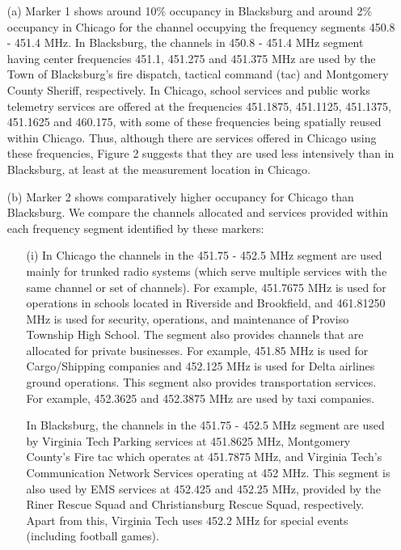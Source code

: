 \documentclass[12pt,sts]{report}
\begin{document}
		\begin{enumerate}
		
			\item[(a)] Marker 1 shows around 10\% occupancy in Blacksburg and around 2\% occupancy in Chicago for the channel occupying the frequency segments 450.8 - 451.4 MHz. In Blacksburg, the channels in 450.8 - 451.4 MHz segment having center frequencies 451.1, 451.275 and 451.375 MHz are used by the Town of Blacksburg's fire dispatch, tactical command (tac) and Montgomery County Sheriff, respectively. In Chicago, school services and public works telemetry services are offered at the frequencies 451.1875, 451.1125, 451.1375, 451.1625 and 460.175, with some of these frequencies being spatially reused within Chicago. 
			Thus, although there are services offered in Chicago using these frequencies, Figure 2 suggests that they are used less intensively than in Blacksburg, at least at the measurement location in Chicago.
			
			\item[(b)] Marker 2 shows comparatively higher occupancy for Chicago than Blacksburg. We compare the channels allocated and services provided within each frequency segment identified by these markers:
			
			\begin{enumerate}
				
				\item[(i)] In Chicago the channels in the 451.75 - 452.5 MHz segment are used mainly for trunked radio systems (which serve multiple services with the same channel or set of channels). For example, 451.7675 MHz is used for operations in schools located in Riverside and Brookfield, and 461.81250 MHz is used for security, operations, and maintenance of Proviso Township High School. The segment also provides channels that are allocated for private businesses. For example, 451.85 MHz is used for Cargo/Shipping companies and 452.125 MHz is used for Delta airlines ground operations. This segment also provides transportation services. For example, 452.3625 and 452.3875 MHz are used by taxi companies.
				
				In Blacksburg, the channels in the 451.75 - 452.5 MHz segment are used by Virginia Tech Parking services at 451.8625 MHz, Montgomery County's Fire tac which operates at 451.7875 MHz, and Virginia Tech's Communication Network Services operating at 452 MHz. This segment is also used by EMS services at 452.425 and 452.25 MHz, provided by the Riner Rescue Squad and Christiansburg Rescue Squad, respectively. Apart from this, Virginia Tech uses 452.2 MHz for special events (including football games).
				

\end{enumerate}
\end{enumerate}
\end{document}
